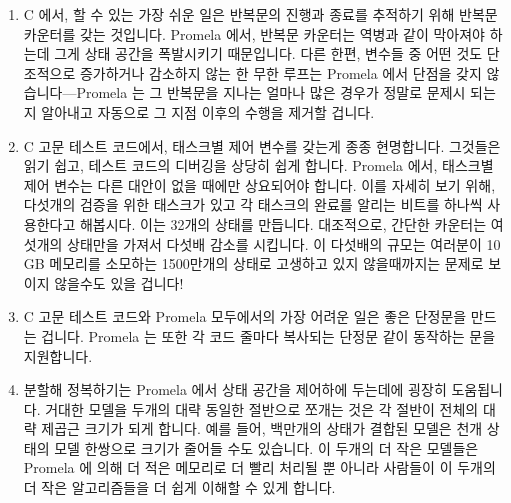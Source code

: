 \begin{enumerate}
\fi

\item	C 에서, 할 수 있는 가장 쉬운 일은 반복문의 진행과 종료를 추적하기 위해
	반복문 카운터를 갖는 것입니다.  Promela 에서, 반복문 카운터는 역병과
	같이 막아져야 하는데 그게 상태 공간을 폭발시키기 때문입니다.  다른
	한편, 변수들 중 어떤 것도 단조적으로 증가하거나 감소하지 않는 한 무한
	루프는 Promela 에서 단점을 갖지 않습니다---Promela 는 그 반복문을
	지나는 얼마나 많은 경우가 정말로 문제시 되는지 알아내고 자동으로 그
	지점 이후의 수행을 제거할 겁니다.
\item	C 고문 테스트 코드에서, 태스크별 제어 변수를 갖는게 종종 현명합니다.
	그것들은 읽기 쉽고, 테스트 코드의 디버깅을 상당히 쉽게 합니다.  Promela
	에서, 태스크별 제어 변수는 다른 대안이 없을 때에만 상요되어야 합니다.
	이를 자세히 보기 위해, 다섯개의 검증을 위한 태스크가 있고 각 태스크의
	완료를 알리는 비트를 하나씩 사용한다고 해봅시다.  이는 32개의 상태를
	만듭니다.  대조적으로, 간단한 카운터는 여섯개의 상태만을 가져서 다섯배
	감소를 시킵니다.  이 다섯배의 규모는 여러분이 10\,GB 메모리를 소모하는
	1500만개의 상태로 고생하고 있지 않을때까지는 문제로 보이지 않을수도
	있을 겁니다!

\iffalse

\item	In C, the easiest thing to do is to maintain a loop counter to track
	progress and terminate the loop.  In Promela, loop counters
	must be avoided like the plague because they cause the state
	space to explode.  On the other hand, there is no penalty for
	infinite loops in Promela as long as none of the variables
	monotonically increase or decrease---Promela will figure out
	how many passes through the loop really matter, and automatically
	prune execution beyond that point.
\item	In C torture-test code, it is often wise to keep per-task control
	variables.  They are cheap to read, and greatly aid in debugging the
	test code.  In Promela, per-task control variables should be used
	only when there is no other alternative.  To see this, consider
	a 5-task verification with one bit each to indicate completion.
	This gives 32 states.  In contrast, a simple counter would have
	only six states, more than a five-fold reduction.  That factor
	of five might not seem like a problem, at least not until you
	are struggling with a verification program possessing more than
	150 million states consuming more than 10\,GB of memory!

\fi

\item	C 고문 테스트 코드와 Promela 모두에서의 가장 어려운 일은 좋은 단정문을
	만드는 겁니다.  Promela 는 또한 각 코드 줄마다 복사되는 단정문 같이
	동작하는  문을 지원합니다.
\item	분할해 정복하기는 Promela 에서 상태 공간을 제어하에 두는데에 굉장히
	도움됩니다.  거대한 모델을 두개의 대략 동일한 절반으로 쪼개는 것은 각
	절반이 전체의 대략 제곱근 크기가 되게 합니다.
	예를 들어, 백만개의 상태가 결합된 모델은 천개 상태의 모델 한쌍으로
	크기가 줄어들 수도 있습니다.
	이 두개의 더 작은 모델들은 Promela 에 의해 더 적은 메모리로 더 빨리
	처리될 뿐 아니라 사람들이 이 두개의 더 작은 알고리즘들을 더 쉽게 이해할
	수 있게 합니다.


\end{enumerate}
